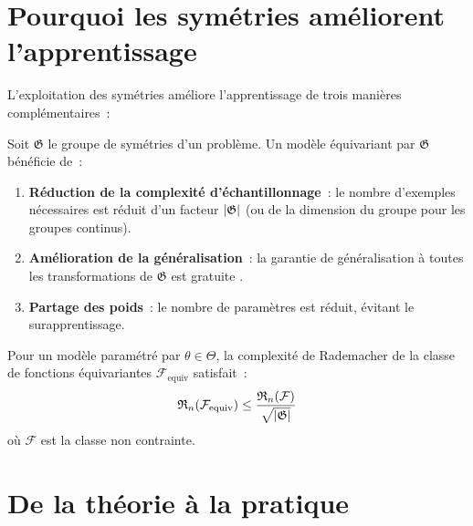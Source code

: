 \section{Pourquoi les sym\'etries am\'eliorent l'apprentissage}

L'exploitation des sym\'etries am\'eliore l'apprentissage de trois mani\`eres
compl\'ementaires~:

\begin{theoreme}
Soit $\mathfrak{G}$ le groupe de sym\'etries d'un probl\`eme. Un mod\`ele
\'equivariant par $\mathfrak{G}$ b\'en\'eficie de~:
\begin{enumerate}
    \item \textbf{R\'eduction de la complexit\'e d'\'echantillonnage}~: le nombre
          d'exemples n\'ecessaires est r\'eduit d'un facteur $\left| \mathfrak{G} \right|$
          (ou de la dimension du groupe pour les groupes continus).
    \item \textbf{Am\'elioration de la g\'en\'eralisation}~: la garantie de
          g\'en\'eralisation \`a toutes les transformations de $\mathfrak{G}$
          est \og gratuite \fg.
    \item \textbf{Partage des poids}~: le nombre de param\`etres est r\'eduit,
          \'evitant le surapprentissage.
\end{enumerate}
\end{theoreme}

\begin{proposition}
Pour un mod\`ele param\'etr\'e par $\theta \in \Theta$, la complexit\'e de Rademacher
de la classe de fonctions \'equivariantes $\mathcal{F}_{\text{equiv}}$ satisfait~:
\[
    \mathfrak{R}_n(\mathcal{F}_{\text{equiv}}) \leq
    \frac{\mathfrak{R}_n(\mathcal{F})}{\sqrt{\left| \mathfrak{G} \right|}}
\]
o\`u $\mathcal{F}$ est la classe non contrainte.
\end{proposition}

\section{De la th\'eorie \`a la pratique}

